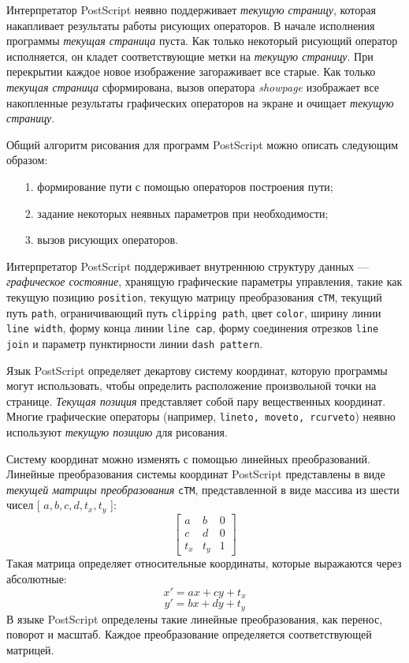 Интерпретатор PostScript неявно поддерживает \textit{текущую страницу}, которая накапливает результаты работы рисующих операторов. В начале исполнения программы \textit{текущая страница} пуста. Как только некоторый рисующий оператор исполняется, он кладет соответствующие метки на \textit{текущую страницу}. При перекрытии каждое новое изображение загораживает все старые. Как только \textit{текущая страница} сформирована, вызов оператора \textit{showpage} изображает все накопленные результаты графических операторов на экране и очищает \textit{текущую страницу}.

Общий алгоритм рисования для программ PostScript можно описать следующим образом:

\begin{itemize}
\item [1. ] формирование пути с помощью операторов построения пути;
\item [2. ] задание некоторых неявных параметров при необходимости;
\item [3. ] вызов рисующих операторов.
\end{itemize} 



Интерпретатор PostScript поддерживает внутреннюю структуру данных --- \textit{графическое состояние}, хранящую графические параметры управления, такие как текущую позицию \texttt{position}, текущую матрицу преобразования \texttt{cTM}, текущий путь \texttt{path}, ограничивающий путь \texttt{clipping path}, цвет \texttt{color}, ширину линии \texttt{line width}, форму конца линии \texttt{line cap}, форму соединения отрезков \texttt{line join} и параметр пунктирности линии \texttt{dash pattern}.


Язык PostScript определяет декартову систему координат, которую программы могут использовать, чтобы определить расположение произвольной точки на странице.  
\textit{Текущая позиция} представляет собой пару вещественных координат. Многие графические операторы (например, \texttt{lineto, moveto, rcurveto}) неявно используют \textit{текущую позицию} для рисования.

Систему координат можно изменять с помощью линейных преобразований. Линейные преобразования системы координат PostScript представлены в виде \textit{текущей матрицы преобразования} \texttt{cTM}, представленной в виде массива из шести чисел [ $a, b, c, d, t_x, t_y$ ]:
\[
\begin{bmatrix}
a & b & 0 \\ c & d & 0 \\ t_x & t_y & 1
\end{bmatrix}
\]
Такая матрица определяет относительные координаты, которые выражаются через абсолютные:
$$ x' = ax + cy + t_x $$
$$   y' = bx + dy + t_y $$ 
В языке PostScript определены такие линейные преобразования, как перенос, поворот и масштаб. Каждое преобразование определяется соответствующей матрицей. 

